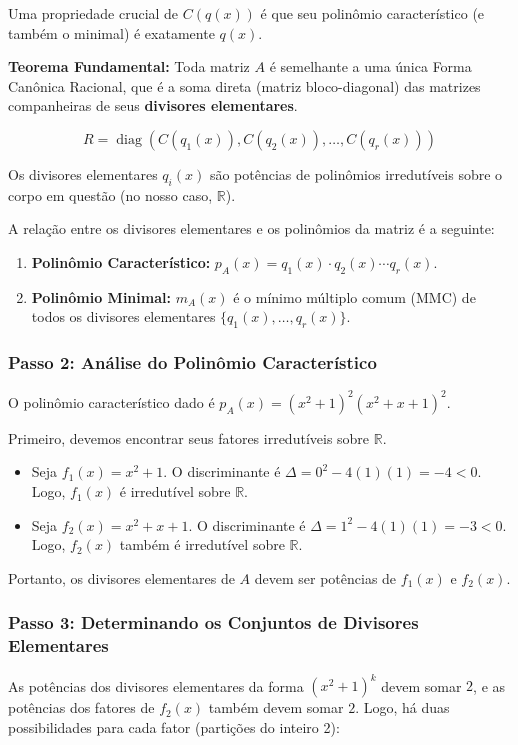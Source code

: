 Uma propriedade crucial de $C(q(x))$ é que seu polinômio característico (e também o minimal) é exatamente $q(x)$.

\textbf{Teorema Fundamental:} Toda matriz $A$ é semelhante a uma única Forma Canônica Racional, que é a soma direta (matriz bloco-diagonal) das matrizes companheiras de seus \textbf{divisores elementares}.

\[
R = \operatorname{diag}(C(q_1(x)), C(q_2(x)), \dots, C(q_r(x)))
\]

Os divisores elementares $q_i(x)$ são potências de polinômios irredutíveis sobre o corpo em questão (no nosso caso, $\mathbb{R}$).

A relação entre os divisores elementares e os polinômios da matriz é a seguinte:
\begin{enumerate}
\item \textbf{Polinômio Característico:} $p_A(x) = q_1(x)\cdot q_2(x)\cdots q_r(x)$.
\item \textbf{Polinômio Minimal:} $m_A(x)$ é o mínimo múltiplo comum (MMC) de todos os divisores elementares $\{q_1(x), \dots, q_r(x)\}$.
\end{enumerate}

\subsubsection*{Passo 2: Análise do Polinômio Característico}

O polinômio característico dado é $p_A(x) = (x^2+1)^2(x^2+x+1)^2$.

Primeiro, devemos encontrar seus fatores irredutíveis sobre $\mathbb{R}$.

\begin{itemize}
\item Seja $f_1(x)=x^2+1$. O discriminante é $\Delta=0^2-4(1)(1)=-4<0$. Logo, $f_1(x)$ é irredutível sobre $\mathbb{R}$.
\item Seja $f_2(x)=x^2+x+1$. O discriminante é $\Delta=1^2-4(1)(1)=-3<0$. Logo, $f_2(x)$ também é irredutível sobre $\mathbb{R}$.
\end{itemize}

Portanto, os divisores elementares de $A$ devem ser potências de $f_1(x)$ e $f_2(x)$.

\subsubsection*{Passo 3: Determinando os Conjuntos de Divisores Elementares}

As potências dos divisores elementares da forma $(x^2+1)^k$ devem somar $2$, e as potências dos fatores de $f_2(x)$ também devem somar $2$. Logo, há duas possibilidades para cada fator (partições do inteiro 2):

